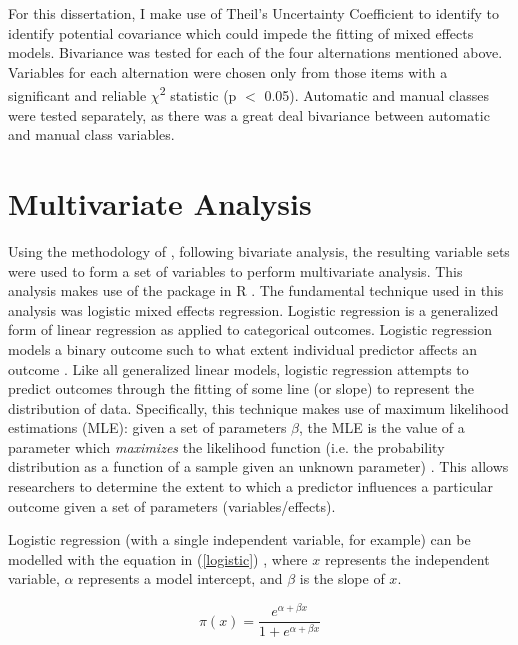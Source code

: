 For this dissertation, I make use of Theil's Uncertainty Coefficient to identify to identify potential covariance which could impede the fitting of mixed effects models. Bivariance was tested for each of the four alternations mentioned above. Variables for each alternation were chosen only from those items with a significant and reliable $\chi$\textsuperscript{2} statistic (p $<$ 0.05). Automatic and manual classes were tested separately, as there was a great deal bivariance between automatic and manual class variables. 

\section{Multivariate Analysis}

Using the methodology of \citet{arppe2008univariate}, following bivariate analysis, the resulting variable sets were used to form a set of variables to perform multivariate analysis. This analysis makes use of the  package in R \citep{lme4}. The fundamental technique used in this analysis was logistic mixed effects regression. Logistic regression is a generalized form of linear regression as applied to categorical outcomes. Logistic regression models a binary outcome such to what extent individual predictor affects an outcome  \citep[163]{agresti2013categorical}. Like all generalized linear models, logistic regression attempts to predict outcomes through the fitting of some line (or slope) to represent the distribution of data. Specifically, this technique makes use of maximum likelihood estimations (MLE): given a set of parameters $\beta$, the MLE is the value of a parameter which \textit{maximizes} the likelihood function (i.e. the probability distribution as a function of a sample given an unknown parameter)  \citep[9]{agresti2013categorical}. This allows researchers to determine the extent to which a predictor influences a particular outcome given a set of parameters (variables/effects).

Logistic regression (with a single independent variable, for example) can be modelled with the equation in (\ref{logistic}) \citep[163]{agresti2013categorical}, where $x$ represents the independent variable, $\alpha$ represents a model intercept, and $\beta$ is the slope of $x$. 

\begin{equation}
\pi(x) = \frac{e^{\alpha + \beta x}}{1+e^{\alpha + \beta x}}
\label{logistic}
\end{equation}


